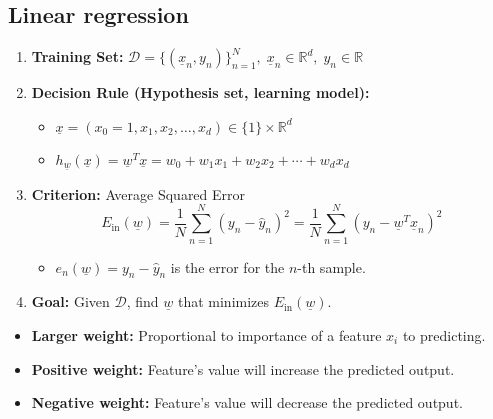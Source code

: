 \subsection{Linear regression}
\begin{definition}
    \begin{enumerate}
        \item \textbf{Training Set:} $\mathcal{D} = \{(\underline{x}_n, y_n)\}_{n=1}^N, \; \underline{x}_n \in \mathbb{R}^d, \; y_n \in \mathbb{R}$
    
        \item \textbf{Decision Rule (Hypothesis set, learning model):} 
        \begin{itemize}
            \item $\underline{x} = (x_0 = 1, x_1, x_2, \dots, x_d) \in \{1\} \times \mathbb{R}^d$
            \item $h_{\underline{w}}(\underline{x}) = \underline{w}^T \underline{x} = w_0 + w_1 x_1 + w_2 x_2 + \cdots + w_d x_d$
        \end{itemize}
    
        \item \textbf{Criterion:} Average Squared Error
        \[
        E_{\text{in}}(\underline{w}) = \frac{1}{N} \sum_{n=1}^{N} (y_n - \hat{y}_n)^2 = \frac{1}{N} \sum_{n=1}^{N} \left( y_n - \underline{w}^T \underline{x}_n \right)^2
        \]
        \begin{itemize}
            \item $e_n(\underline{w}) = y_n - \hat{y}_n$ is the error for the $n$-th sample.
        \end{itemize}
    
        \item \textbf{Goal:} Given $\mathcal{D}$, find $\underline{w}$ that minimizes $E_{\text{in}}(\underline{w})$.
    \end{enumerate}
\end{definition}

\begin{intuition}
    \begin{itemize}
        \item \textbf{Larger weight:} Proportional to importance of a feature $x_i$ to predicting.
        \item \textbf{Positive weight:} Feature's value will increase the predicted output.
        \item \textbf{Negative weight:} Feature's value will decrease the predicted output.
    \end{itemize}
\end{intuition}

